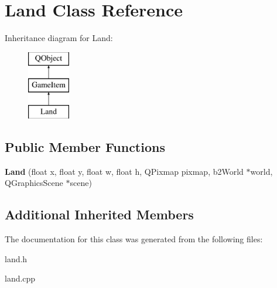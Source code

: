 \hypertarget{classLand}{\section{Land Class Reference}
\label{classLand}
}
Inheritance diagram for Land\-:\begin{figure}[H]
\begin{center}
\leavevmode
\includegraphics[height=3.000000cm]{classLand}
\end{center}
\end{figure}
\subsection*{Public Member Functions}
\begin{DoxyCompactItemize}
\item 
\hypertarget{classLand_af64ca60994a44576509387d0bf5cb299}{{\bfseries Land} (float x, float y, float w, float h, Q\-Pixmap pixmap, b2\-World $\ast$world, Q\-Graphics\-Scene $\ast$scene)}\label{classLand_af64ca60994a44576509387d0bf5cb299}

\end{DoxyCompactItemize}
\subsection*{Additional Inherited Members}


The documentation for this class was generated from the following files\-:\begin{DoxyCompactItemize}
\item 
land.\-h\item 
land.\-cpp\end{DoxyCompactItemize}
